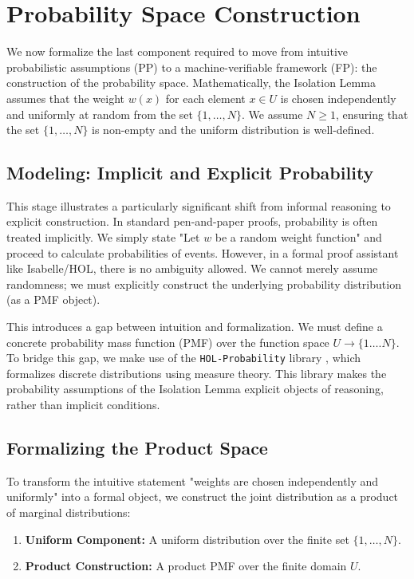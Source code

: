 \section{Probability Space Construction}
\label{sec:prob_space}

We now formalize the last component required to move from intuitive probabilistic assumptions (PP) to a machine-verifiable framework (FP): the construction of the probability space.
Mathematically, the Isolation Lemma assumes that the weight $w(x)$ for each element $x \in U$ is chosen independently and uniformly at random from the set $\{1,\dots,N\}$.
We assume $N \ge 1$, ensuring that the set $\{1, \dots, N\}$ is non-empty and the uniform distribution is well-defined.

\subsection*{Modeling: Implicit and Explicit Probability}
This stage illustrates a particularly significant shift from informal reasoning to explicit construction.
In standard pen-and-paper proofs, probability is often treated implicitly. We simply state "Let $w$ be a random weight function" and proceed to calculate probabilities of events.
However, in a formal proof assistant like Isabelle/HOL, there is no ambiguity allowed.
We cannot merely assume randomness; we must explicitly construct the underlying probability distribution (as a PMF object).

This introduces a gap between intuition and formalization.
We must define a concrete probability mass function (PMF) over the function space $U \to \{1 \dots. N\}$.
To bridge this gap, we make use of the \texttt{HOL-Probability} library \cite{isabelleprob}, which formalizes discrete distributions using measure theory.
This library makes the probability assumptions of the Isolation Lemma explicit objects of reasoning, rather than implicit conditions.


\subsection*{Formalizing the Product Space}
To transform the intuitive statement "weights are chosen independently and uniformly" into a formal object, we construct the joint distribution as a product of marginal distributions:

\begin{enumerate}
  \item \textbf{Uniform Component:} A uniform distribution over the finite set $\{1, \dots, N\}$.
  \item \textbf{Product Construction:} A product PMF over the finite domain $U$.
\end{enumerate}

